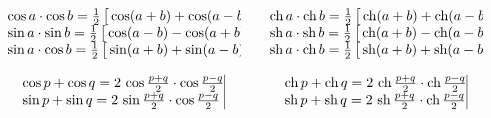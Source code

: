\begin{frame}
\begin{columns}
\begin{column}{2cm}
  
\end{column}

\begin{column}{6cm}
{\footnotesize
$$\begin{array}{l@{\vrule depth 1.2ex height 3ex width 0mm }}
\cos a\cdot\cos b = \frac{1}{2}\,\big[ \cos(a+b)+\cos(a-b)\big]\\
\sin a\cdot\sin b = \frac{1}{2}\,\big[ \cos(a-b)-\cos(a+b)\big]\\
\sin a\cdot\cos b = \frac{1}{2}\,\big[ \sin(a+b)+\sin(a-b)\big]    
  \end{array}$$
}

\pause

$$\begin{array}{l@{\vrule depth 1.2ex height 3ex width 0mm }}
\cos p+\cos q = 2\,\cos \frac{p+q}{2}\cdot\cos\frac{p-q}{2}\\
\sin p+\sin q = 2\,\sin \frac{p+q}{2}\cdot\cos\frac{p-q}{2}\\
  \end{array}$$
\end{column} 
\pause
\begin{column}{6cm}
{\footnotesize
$$\begin{array}{l@{\vrule depth 1.2ex height 3ex width 0mm }}
\ch a\cdot\ch b = \frac{1}{2}\,\big[ \ch(a+b)+\ch(a-b)\big]\\
\sh a\cdot\sh b = \frac{1}{2}\,\big[ \ch(a+b)-\ch(a-b)\big]\\
\sh a\cdot\ch b = \frac{1}{2}\,\big[ \sh(a+b)+\sh(a-b)\big]\\
  \end{array}$$
}

\pause

$$\begin{array}{l@{\vrule depth 1.2ex height 3ex width 0mm }}
\ch p+\ch q = 2\,\ch \frac{p+q}{2}\cdot\ch\frac{p-q}{2}\\
\sh p+\sh q = 2\,\sh \frac{p+q}{2}\cdot\ch\frac{p-q}{2}\\
  \end{array}$$
\end{column}
\end{columns}
\end{frame}

